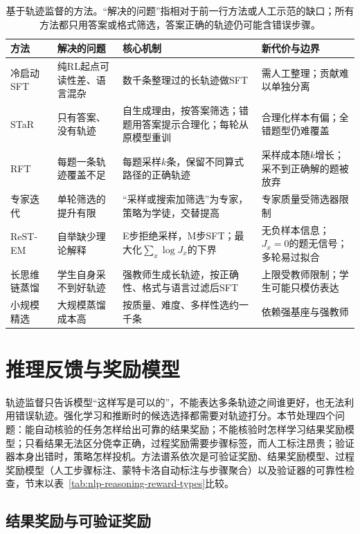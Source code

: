 \begin{table}[htbp]
  \centering
  \small
  \caption{基于轨迹监督的方法。“解决的问题”指相对于前一行方法或人工示范的缺口；所有方法都只用答案或格式筛选，答案正确的轨迹仍可能含错误步骤。}
  \label{tab:nlp-reasoning-trace-methods}
  \begin{tabularx}{\linewidth}{@{}p{24mm}p{34mm}Xp{38mm}@{}}
    \toprule
    方法 & 解决的问题 & 核心机制 & 新代价与边界\\
    \midrule
    冷启动SFT & 纯RL起点可读性差、语言混杂 & 数千条整理过的长轨迹做SFT & 需人工整理；贡献难以单独分离\\
    STaR & 只有答案、没有轨迹 & 自生成理由，按答案筛选；错题用答案提示合理化；每轮从原模型重训 & 合理化样本有偏；全错题型仍难覆盖\\
    RFT & 每题一条轨迹覆盖不足 & 每题采样$k$条，保留不同算式路径的正确轨迹 & 采样成本随$k$增长；采不到正确解的题被放弃\\
    专家迭代 & 单轮筛选的提升有限 & “采样或搜索加筛选”为专家，策略为学徒，交替提高 & 专家质量受筛选器限制\\
    ReST-EM & 自举缺少理论解释 & E步拒绝采样，M步SFT；最大化$\sum_x\log J_x$的下界 & 无负样本信息；$J_x=0$的题无信号；多轮易过拟合\\
    长思维链蒸馏 & 学生自身采不到好轨迹 & 强教师生成长轨迹，按正确性、格式与语言过滤后SFT & 上限受教师限制；学生可能只模仿表达\\
    小规模精选 & 大规模蒸馏成本高 & 按质量、难度、多样性选约一千条 & 依赖强基座与强教师\\
    \bottomrule
  \end{tabularx}
\end{table}

\section{推理反馈与奖励模型}
\label{sec:nlp-reasoning-feedback}

轨迹监督只告诉模型“这样写是可以的”，不能表达多条轨迹之间谁更好，也无法利用错误轨迹。强化学习和推断时的候选选择都需要对轨迹打分。本节处理四个问题：能自动核验的任务怎样给出可靠的结果奖励；不能核验时怎样学习结果奖励模型；只看结果无法区分侥幸正确，过程奖励需要步骤标签，而人工标注昂贵；验证器本身出错时，策略怎样投机。方法谱系依次是可验证奖励、结果奖励模型、过程奖励模型（人工步骤标注、蒙特卡洛自动标注与步骤聚合）以及验证器的可靠性检查，节末以表~\ref{tab:nlp-reasoning-reward-types}比较。

\subsection{结果奖励与可验证奖励}
\label{sec:nlp-reasoning-rewards}

